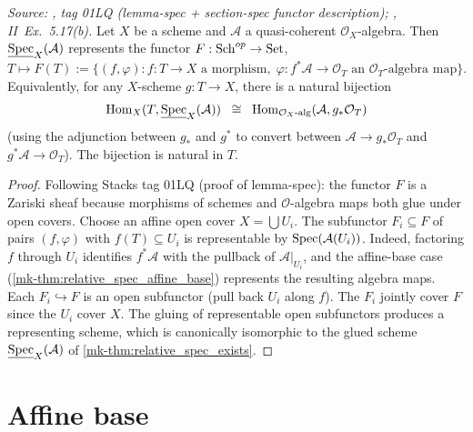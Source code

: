 \begin{theorem}
  \label{mk-thm:relative_spec_univ}
  \textit{Source: \cite{stacks-project}, tag 01LQ (lemma-spec + section-spec
  functor description); \cite{hartshorne-ag}, II~Ex.~5.17(b).}
  Let \(X\) be a scheme and \(\mathcal{A}\) a quasi-coherent \(\mathcal{O}_X\)-algebra.
  Then \(\underline{\operatorname{Spec}}_X(\mathcal{A})\) represents the functor
  \(F : \operatorname{Sch}^{op} \to \mathrm{Set}\),
  $T \mapsto F(T) := \{(f, \varphi) : f : T \to X \text{ a morphism},\;
  \varphi : f^* \mathcal{A} \to \mathcal{O}_T \text{ an } \mathcal{O}_T\text{-algebra map}\}.$
  Equivalently, for any \(X\)-scheme \(g : T \to X\),
  there is a natural bijection
  \[
    \operatorname{Hom}_X(T, \underline{\operatorname{Spec}}_X(\mathcal{A})) \;\;\cong\;\;
    \operatorname{Hom}_{\mathcal{O}_X\text{-alg}}(\mathcal{A}, g_* \mathcal{O}_T)
  \]
  (using the adjunction between \(g_*\) and \(g^*\) to convert between
  \(\mathcal{A} \to g_*\mathcal{O}_T\) and \(g^*\mathcal{A} \to \mathcal{O}_T\)).
  The bijection is natural in \(T\).
\end{theorem}

\begin{proof}
  Following Stacks tag 01LQ (proof of lemma-spec): the functor \(F\) is a Zariski sheaf
  because morphisms of schemes and \(\mathcal{O}\)-algebra maps both glue under open covers.
  Choose an affine open cover \(X = \bigcup U_i\). The subfunctor
  \(F_i \subseteq F\) of pairs \((f, \varphi)\) with \(f(T) \subseteq U_i\) is representable by
  \(\operatorname{Spec}(\mathcal{A}(U_i))\). Indeed, factoring \(f\) through \(U_i\) identifies
  \(f^*\mathcal{A}\) with the pullback of \(\mathcal{A}|_{U_i}\), and the affine-base
  case (\ref{mk-thm:relative_spec_affine_base}) represents the resulting algebra maps.
  Each \(F_i \hookrightarrow F\) is an open
  subfunctor (pull back \(U_i\) along \(f\)). The \(F_i\) jointly cover \(F\) since the \(U_i\)
  cover \(X\). The gluing of representable open subfunctors produces a representing scheme,
  which is canonically isomorphic to the glued scheme \(\underline{\operatorname{Spec}}_X(\mathcal{A})\)
  of \ref{mk-thm:relative_spec_exists}.
\end{proof}

\section{Affine base}
\label{mk-sec:relspec_affine}

